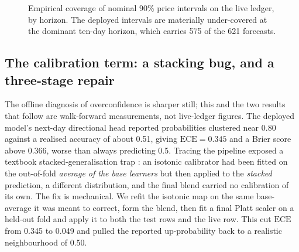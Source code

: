 \documentclass{sbc2023}%
\theoremstyle{definition}
\theoremstyle{plain}
\newcommand{\ece}{\mathrm{ECE}}
\begin{document}
\begin{figure}[t]
\centering
{}
\caption{Empirical coverage of nominal 90\% price intervals on the live ledger, by
horizon. The deployed intervals are materially under-covered at the dominant ten-day
horizon, which carries 575 of the 621 forecasts.}
\label{fig:cov}
\end{figure}

\subsection{The calibration term: a stacking bug, and a three-stage repair}
\label{sec:resultcal}
The offline diagnosis of overconfidence is sharper still; this and the two results
that follow are walk-forward measurements, not live-ledger figures. The deployed
model's next-day directional head reported probabilities clustered near 0.80 against a
realised accuracy of about 0.51, giving $\ece=0.345$ and a Brier score above 0.366,
worse than always predicting 0.5. Tracing the pipeline exposed a textbook
stacked-generalisation trap \citep{wolpert1992}: an isotonic calibrator had been fitted on
the out-of-fold \emph{average of the base learners} but then applied to the
\emph{stacked} prediction, a different distribution, and the final blend carried no
calibration of its own. The fix is mechanical. We refit the isotonic map on the same
base-average it was meant to correct, form the blend, then fit a final Platt scaler
\citep{platt1999} on a held-out fold and apply it to both the test rows and the live row.
This cut $\ece$ from 0.345 to 0.049 and pulled the reported up-probability back to a
realistic neighbourhood of 0.50.
\end{document}
